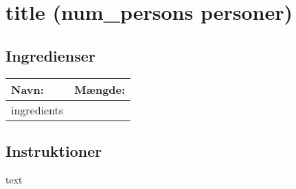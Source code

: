 \section{ {{title}} ({{num_persons}} personer)}

\subsection*{Ingredienser}

\begin{tabular}{|l|l|}
  \hline
  \bf{Navn:} & \bf{Mængde:} \\
  \hline\hline
  {{ingredients}}
  \hline
\end{tabular}

\subsection*{Instruktioner}

{{text}}

